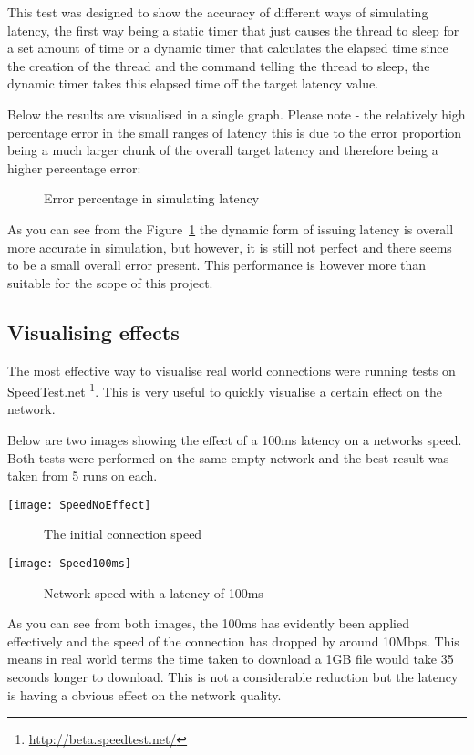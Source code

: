 This test was designed to show the accuracy of different ways of simulating latency, the first way being a static timer that just causes the thread to sleep for a set amount of time or a dynamic timer that calculates the elapsed time since the creation of the thread and the command telling the thread to sleep, the dynamic timer takes this elapsed time off the target latency value.

Below the results are visualised in a single graph. Please note - the relatively high percentage error in the small ranges of latency this is due to the error proportion being a much larger chunk of the overall target latency and therefore being a higher percentage error:

\begin{center}
	
	\begin{figure}[h]
		\caption{Error percentage in simulating latency}
		\label{ref:latencyAccuracy}
	\end{figure}
\end{center}


As you can see from the Figure~\ref{ref:latencyAccuracy} the dynamic form of issuing latency is overall more accurate in simulation, but however, it is still not perfect and there seems to be a small overall error present. This performance is however more than suitable for the scope of this project.

\subsection{Visualising effects}
The most effective way to visualise real world connections were running tests on SpeedTest.net \footnote{\url{http://beta.speedtest.net/}}. This is very useful to quickly visualise a certain effect on the network.

Below are two images showing the effect of a 100ms latency on a networks speed. Both tests were performed on the same empty network and the best result was taken from 5 runs on each.

\begin{center}
	\texttt{[image: SpeedNoEffect]}
	\begin{figure}[h]
		\caption{The initial connection speed}
	\end{figure}
\end{center}

\begin{center}
	\texttt{[image: Speed100ms]}
	\begin{figure}[h]
		\caption{Network speed with a latency of 100ms}
	\end{figure}
\end{center}

As you can see from both images, the 100ms has evidently been applied effectively and the speed of the connection has dropped by around 10Mbps. This means in real world terms the time taken to download a 1GB file would take 35 seconds longer to download. This is not a considerable reduction but the latency is having a obvious effect on the network quality.
